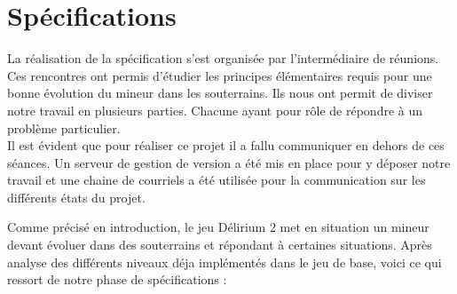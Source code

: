 \documentclass[a4paper,11pt]{article}
\begin{document}
	\newpage
	\section{Sp\'ecifications}
	
La r\'ealisation de la sp\'ecification s'est organis\'ee par l'interm\'ediaire de r\'eunions. Ces rencontres ont permis d'\'etudier les principes \'el\'ementaires requis pour une bonne \'evolution du mineur dans les souterrains. Ils nous ont permit de diviser notre travail en plusieurs parties. Chacune ayant pour r\^ole de r\'epondre \`a un probl\`eme particulier.\\

Il est \'evident que pour r\'ealiser ce projet il a fallu communiquer en dehors de ces s\'eances. Un serveur de gestion de version a  \'et\'e mis en place pour y d\'eposer notre travail et une chaine de courriels a \'et\'e utilis\'ee pour la communication sur les diff\'erents \'etats du projet.

Comme pr\'ecis\'e en introduction, le jeu D\'elirium 2 met en situation un mineur devant \'evoluer dans des souterrains et r\'epondant \`a certaines situations. Apr\`es analyse des diff\'erents niveaux d\'eja impl\'ement\'es dans le jeu de base, voici ce qui ressort de notre phase de sp\'ecifications :\\
		
\end{document}
